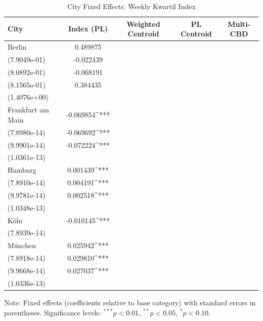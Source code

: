 \begin{table}[h!]
\centering
\caption{City Fixed Effects: Weekly Kwartil Index}
\label{tab:city_fe_index_wk}
\begin{tabular}{lcccc}
\toprule
City & Index (PL) & Weighted Centroid & PL Centroid & Multi-CBD \\
\midrule
Berlin & 0.489875 \\ (7.9049e-01) & -0.022439 \\ (8.0892e-01) & -0.068191 \\ (8.1565e-01) & 0.384435 \\ (1.4076e+00) \\
Frankfurt am Main & -0.069854^{***} \\ (7.8980e-14) & -0.069692^{***} \\ (9.9901e-14) & -0.072224^{***} \\ (1.0361e-13) &  \\
Hamburg & 0.001439^{***} \\ (7.8910e-14) & 0.004191^{***} \\ (9.9781e-14) & 0.002518^{***} \\ (1.0348e-13) &  \\
Köln & -0.010145^{***} \\ (7.8939e-14) &  &  &  \\
München & 0.025942^{***} \\ (7.8918e-14) & 0.029810^{***} \\ (9.9668e-14) & 0.027037^{***} \\ (1.0336e-13) &  \\
\bottomrule
\end{tabular}
\begin{tablenotes}[para]
\small
Note: Fixed effects (coefficients relative to base category) with standard errors in parentheses.
Significance levels: $^{***} p<0.01$, $^{**} p<0.05$, $^{*} p<0.10$.
\end{tablenotes}
\end{table}
